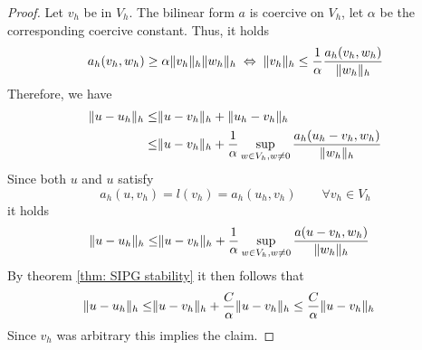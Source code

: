 \begin{proof}
	Let $v_h$ be in $V_h$.
The bilinear form $a$ is coercive on $V_h$, let $\alpha$ be the corresponding coercive constant. 
Thus, it holds
\[
	a_h(v_h, w_h) \geq \alpha \lVert v_h \rVert_{h} \lVert w_h \rVert_{h} 
	\; \Leftrightarrow \;
	\lVert v_h \rVert_{h} \leq \frac 1 \alpha \frac {a_h(v_h,w_h)} {\lVert w_h \rVert_{h}} 	
\]
Therefore, we have
\begin{align*}
  \lVert u-u_h \rVert_{h} \leq& \lVert u-v_h \rVert_{h} + \lVert u_h-v_h \rVert_{h} \\
  \leq& \lVert u-v_h \rVert_{h} + \frac 1 \alpha \sup_{w \in V_h, w \neq 0} \frac {a_h(u_h-v_h, w_h) }{\lVert w_h \rVert_{h}}
\end{align*}
Since both $u$ and $u$ satisfy
\[
	a_h(u,v_h) = l(v_h) = a_h(u_h,v_h) \qquad \forall v_h \in V_h
\]
it holds
\begin{align*}
  \lVert u-u_h \rVert_{h} \leq& \lVert u-v_h \rVert_{h} + \frac 1 \alpha \sup_{w \in V_h, w \neq 0} \frac {a(u-v_h, w_h) }{\lVert w_h \rVert_{h}}
\end{align*}
By theorem \ref{thm: SIPG stability} it then follows that
\begin{align*}
\lVert u-u_h \rVert_{h} \leq& \lVert u-v_h \rVert_{h} + \frac C \alpha \lVert u-v_h \rVert_{h} \leq \frac C \alpha \lVert u-v_h \rVert_{h}
\end{align*}
Since $v_h$ was arbitrary this implies the claim.
\end{proof}



